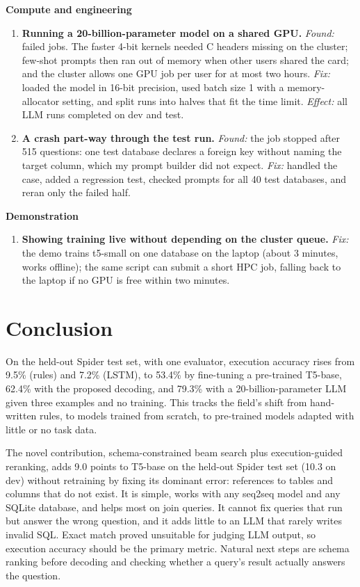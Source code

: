 \documentclass[
  10pt,
]{article}
\providecommand{\tightlist}{%
  \setlength{\itemsep}{0pt}\setlength{\parskip}{0pt}}
\begin{document}
\textbf{Compute and engineering}

\begin{enumerate}
\def\labelenumi{\arabic{enumi}.}
\setcounter{enumi}{9}
\tightlist
\item
  \textbf{Running a 20-billion-parameter model on a shared GPU.}
  \emph{Found:} failed jobs. The faster 4-bit kernels needed C headers
  missing on the cluster; few-shot prompts then ran out of memory when
  other users shared the card; and the cluster allows one GPU job per
  user for at most two hours. \emph{Fix:} loaded the model in 16-bit
  precision, used batch size 1 with a memory-allocator setting, and
  split runs into halves that fit the time limit. \emph{Effect:} all LLM
  runs completed on dev and test.
\item
  \textbf{A crash part-way through the test run.} \emph{Found:} the job
  stopped after 515 questions: one test database declares a foreign key
  without naming the target column, which my prompt builder did not
  expect. \emph{Fix:} handled the case, added a regression test, checked
  prompts for all 40 test databases, and reran only the failed half.
\end{enumerate}

\textbf{Demonstration}

\begin{enumerate}
\def\labelenumi{\arabic{enumi}.}
\setcounter{enumi}{11}
\tightlist
\item
  \textbf{Showing training live without depending on the cluster queue.}
  \emph{Fix:} the demo trains t5-small on one database on the laptop
  (about 3 minutes, works offline); the same script can submit a short
  HPC job, falling back to the laptop if no GPU is free within two
  minutes.
\end{enumerate}

\section{Conclusion}\label{conclusion}

On the held-out Spider test set, with one evaluator, execution accuracy
rises from 9.5\% (rules) and 7.2\% (LSTM), to 53.4\% by fine-tuning a
pre-trained T5-base, 62.4\% with the proposed decoding, and 79.3\% with
a 20-billion-parameter LLM given three examples and no training. This
tracks the field's shift from hand-written rules, to models trained from
scratch, to pre-trained models adapted with little or no task data.

The novel contribution, schema-constrained beam search plus
execution-guided reranking, adds 9.0 points to T5-base on the held-out
Spider test set (10.3 on dev) without retraining by fixing its dominant
error: references to tables and columns that do not exist. It is simple,
works with any seq2seq model and any SQLite database, and helps most on
join queries. It cannot fix queries that run but answer the wrong
question, and it adds little to an LLM that rarely writes invalid SQL.
Exact match proved unsuitable for judging LLM output, so execution
accuracy should be the primary metric. Natural next steps are schema
ranking before decoding and checking whether a query's result actually
answers the question.
\end{document}
